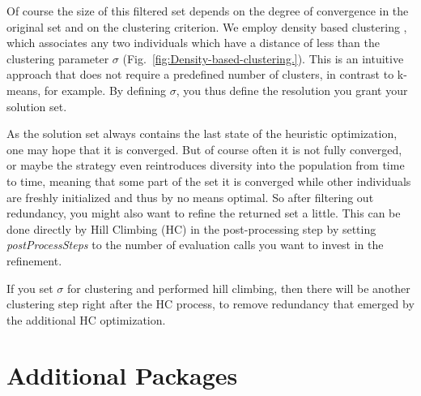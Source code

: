 Of course the size of this filtered set depends on the degree of convergence
in the original set and on the clustering criterion. We employ density
based clustering \cite{ester96density}, which associates any two
individuals which have a distance of less than the clustering parameter
$\sigma$ (Fig.~\ref{fig:Density-based-clustering.}). This is an
intuitive approach that does not require a predefined number of clusters,
in contrast to k-means, for example. By defining $\sigma$, you thus
define the resolution you grant your solution set.

As the solution set always contains the last state of the heuristic
optimization, one may hope that it is converged. But of course often
it is not fully converged, or maybe the strategy even reintroduces diversity into
the population from time to time, meaning that some part of the set
it is converged while other individuals are freshly initialized and
thus by no means optimal. So after filtering out redundancy, you might
also want to refine the returned set a little. This can be done directly
by Hill Climbing (HC) in the post-processing step by setting \emph{postProcessSteps}
to the number of evaluation calls you want to invest in the refinement.

If you set $\sigma$ for clustering and performed hill climbing, then
there will be another clustering step right after the HC process,
to remove redundancy that emerged by the additional HC optimization.


\section{Additional Packages}

